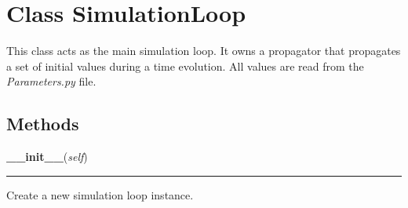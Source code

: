 
\section{Class SimulationLoop}

    \label{SimulationLoop:SimulationLoop}
This class acts as the main simulation loop. It owns a propagator that
propagates a set of initial values during a time evolution. All values are
read from the \textit{Parameters.py} file.



  \subsection{Methods}

    \label{SimulationLoop:SimulationLoop:__init__}

    \vspace{0.5ex}

\hspace{.8\funcindent}\begin{boxedminipage}{\funcwidth}

    \raggedright \textbf{\_\_init\_\_}(\textit{self})

    \vspace{-1.5ex}

    \rule{\textwidth}{0.5\fboxrule}
\setlength{\parskip}{2ex}
    Create a new simulation loop instance.

\setlength{\parskip}{1ex}
    \end{boxedminipage}

    \label{SimulationLoop:SimulationLoop:add_fourier_propagator}

    \vspace{0.5ex}

